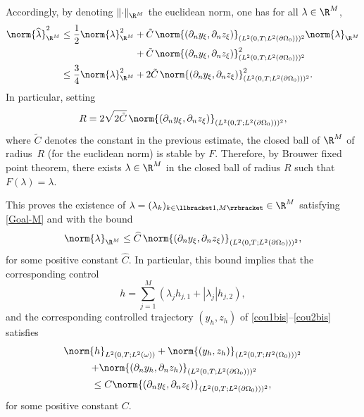 Accordingly, by denoting $\Vert {\cdot} \Vert_{\R^M}$ the euclidean norm, one has for all $\lambda \in \R^M$,
\begin{align*}
\norm{\widehat \lambda}_{\R^M}^2
\leq
\frac{1}{2} \norm{ \lambda}_{\R^M}^2
&+
\tilde{C}\, \norm{(\partial_n y_\xi, \partial_n z_\xi)}_{(L^2(0,T; L^2(\partial \Omega_0)))^2} \norm{\lambda}_{\R^M}\\
&+
\tilde{C}\, \norm{(\partial_n y_\xi, \partial_n z_\xi)}_{(L^2(0,T; L^2(\partial \Omega_0)))^2}^2
\\
\leq
\frac{3}{4} \norm{\lambda}_{\R^M}^2
&+
2\tilde{C}\,\norm{(\partial_n y_\xi, \partial_n z_\xi)}_{(L^2(0,T; L^2(\partial \Omega_0)))^2}^2.
\end{align*}
In particular, setting
\[
R = 2\sqrt{2\tilde C}\, \norm{(\partial_n y_\xi, \partial_n z_\xi)}_{(L^2(0,T; L^2(\partial \Omega_0)))^2},
\]
where $\tilde C$ denotes the constant in the previous estimate, the closed ball of $\R^M$ of radius~$R$ (for the euclidean norm) is stable by $F$. Therefore, by Brouwer fixed point theorem, there exists $\lambda \in \R^M$ in the closed ball of radius $R$ such that $F(\lambda) = \lambda$.

This proves the existence of $\lambda = (\lambda_k)_{k \in \llbracket 1,M \rrbracket } \in \R^M$ satisfying \eqref{Goal-M} and with the bound
\begin{equation}
\label{Est-Lambda}
\norm{\lambda}_{\R^M} \leq \widehat C\, \norm{(\partial_n y_\xi, \partial_n z_\xi)}_{(L^2(0,T; L^2(\partial \Omega_0)))^2},
\end{equation}
for some positive constant $\widehat C$.
In particular, this bound implies that the corresponding control
\begin{equation}
\label{Control-h-Exact}
h = \sum_{j= 1}^M (\lambda_{j} h_{j,1} + |\lambda_{j}| h_{j,2}),
\end{equation}
and the corresponding controlled trajectory $(y_h,z_h)$ of \eqref{cou1bis}--\eqref{cou2bis} satisfies
\begin{multline}
\label{Bound-p-n-y-h-z-h}
\norm{h}_{L^2(0,T; L^2(\omega))}
+
\norm{(y_h,z_h)}_{(L^2(0,T; H^2(\Omega_0)))^2}\\
\hspace*{-6mm}+
\norm{(\partial_n y_h, \partial_n z_h)}_{(L^2(0,T; L^2(\partial \Omega_0)))^2}
\\
\leq
C \norm{(\partial_n y_\xi, \partial_n z_\xi)}_{(L^2(0,T; L^2(\partial \Omega_0)))^2},
\end{multline}
for some positive constant $C$.

